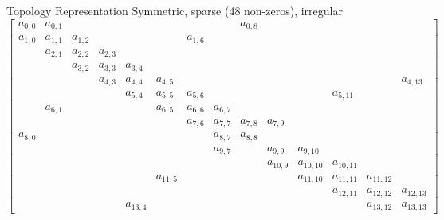 \documentclass[xcolor=dvipsnames]{beamer}
\begin{document}
\begin{frame}{Topology Representation}
Symmetric, sparse (48 non-zeros), irregular
  \begingroup
  \tiny
  \centering
\begin{equation*}
\begin{bmatrix}
a_{0,0} & a_{0,1} &  &  &  &  &  &  & a_{0,8} &  &  &  &  & \\
a_{1,0} & a_{1,1} & a_{1,2} &  &  &  & a_{1,6} &  &  &  &  &  &  & \\
& a_{2,1} & a_{2,2} & a_{2,3} &  &  &  &  &  &  &  &  &  & \\
&  & a_{3,2} & a_{3,3} & a_{3,4} &  &  &  &  &  &  &  &  & \\
&  &  & a_{4,3} & a_{4,4} & a_{4,5} &  &  &  &  &  &  &  & a_{4,13} \\
&  &  &  & a_{5,4} & a_{5,5} & a_{5,6} &  &  &  &  & a_{5,11} &  & \\
& a_{6,1} &  &  &  & a_{6,5} & a_{6,6} & a_{6,7} &  &  &  &  &  & \\
&  &  &  &  &  & a_{7,6} & a_{7,7} & a_{7,8} & a_{7,9} &  &  &  & \\
a_{8,0} &  &  &  &  &  &  & a_{8,7} & a_{8,8} &  &  &  &  & \\
&  &  &  &  &  &  & a_{9,7} &  & a_{9,9} & a_{9,10} &  &  & \\
&  &  &  &  &  &  &  &  & a_{10,9} & a_{10,10} & a_{10,11} &  & \\
&  &  &  &  & a_{11,5} &  &  &  &  & a_{11,10} & a_{11,11} & a_{11,12} & \\
&  &  &  &  &  &  &  &  &  &  & a_{12,11} & a_{12,12}  & a_{12,13}\\
&  &  &  & a_{13,4} &  &  &  &  &  &  &  & a_{13,12} &  a_{13,13}
\end{bmatrix}
\end{equation*}
\endgroup
\end{frame}
\end{document}
